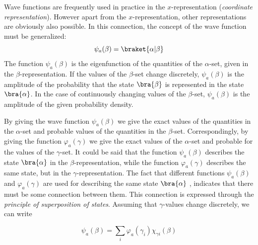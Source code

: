 \documentclass[a4paper,sfsidenotes,colorlinks=true]{tufte-book}
\numberwithin{equation}{section}
\numberwithin{figure}{section}
\begin{document}
Wave 
functions are frequently used in practice in the $x$-representation
(\emph{coordinate representation}). However  apart from the
$x$-representation, other representations are obviously also
possible. In this connection, the concept of the wave function must be
generalized: 
\begin{equation}%
\psi_{a} (\beta) = \braket{\alpha | \beta}
\label{eq-15.4} 
\end{equation}
The function $\psi_{a} (\beta) $ is the eigenfunction of the
quantities of the $\alpha$-set, given in the
$\beta$-representation. If the values of the $\beta$-set change
discretely, $\psi_{a} (\beta) $ is the amplitude of the probability
that the state $\bra{\beta}$ is represented in the state
$\bra{\alpha}$. In the case of continuously changing values of the
$\beta$-set, $\psi_{a} (\beta)$ is the amplitude of the given
probability density.

By giving the wave function $\psi_{a} (\beta) $ we give the exact
values of the quantities in the $\alpha$-set and probable values of
the quantities in the $\beta$-set. Correspondingly, by giving the
function $\varphi_{a} (\gamma) $ we give the exact values of the
$\alpha$-set and probable for the values of the $\gamma$-set. It could
be said that the function $\psi_{a} (\beta) $ describes the state
$\bra{\alpha}$ in the $\beta$-representation, while the function
$\varphi_{a} (\gamma)$ describes the same state, but in the
$\gamma$-representation. The fact that different functions $\psi_{a}
(\beta)$ and $\varphi_{a} (\gamma)$ are used for describing the same
state $\bra{\alpha}$ , indicates that there must be some connection
between them. This connection is expressed through the \emph{principle
  of superposition of states}.  Assuming that $\gamma$-values change
discretely, we can write 

\begin{equation}%
\psi_{a} (\beta) = \sum_{i} \varphi_{a} (\gamma_{i}) \chi_{\gamma i} (\beta)
\label{eq-15.5}
\end{equation}
\end{document}

